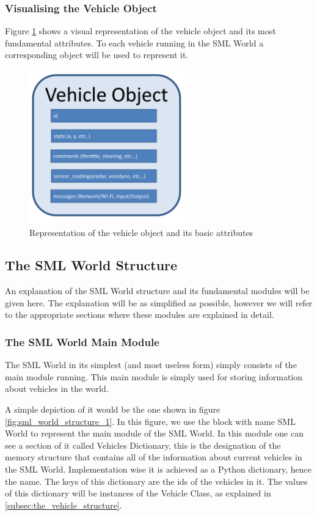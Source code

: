 \subsubsection{Visualising the Vehicle Object}

Figure \ref{fig:vehicle_object} shows a visual representation of the vehicle object and its most fundamental attributes. To each vehicle running in the SML World a corresponding object will be used to represent it.

\begin{figure}[h!]
  \centering
    \includegraphics[width=0.6\textwidth]{vehicle_object}
    \caption{Representation of the vehicle object and its basic attributes \label{fig:vehicle_object} }
\end{figure}

\subsection{The SML World Structure}

An explanation of the SML World structure and its fundamental modules will be given here. The explanation will be as simplified as possible, however we will refer to the appropriate sections where these modules are explained in detail.

\subsubsection{The SML World Main Module}

The SML World in its simplest (and most useless form) simply consists of the main module running. This main module is simply used for storing information about vehicles in the world.

A simple depiction of it would be the one shown in figure \ref{fig:sml_world_structure_1}. In this figure, we use the block with name SML World to represent the main module of the SML World. In this module one can see a section of it called Vehicles Dictionary, this is the designation of the memory structure that contains all of the information about current vehicles in the SML World. Implementation wise it is achieved as a Python dictionary, hence the name. The keys of this dictionary are the ids of the vehicles in it. The values of this dictionary will be instances of the Vehicle Class, as explained in \ref{subsec:the_vehicle_structure}.


